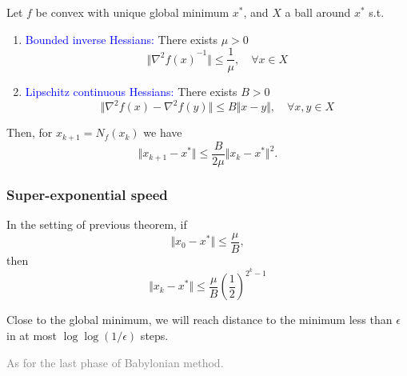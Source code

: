\documentclass[aspectratio=149]{beamer}
\begin{document}
\begin{frame}
  \begin{theorem}
    Let $f$ be convex with unique global minimum $x^*$, and $X$ a ball around $x^*$ s.t.
    \begin{enumerate}
      \item \textcolor{blue}{Bounded inverse Hessians:} There exists $\mu > 0$
            \begin{equation}
              \Vert {\nabla^2 f(x)}^{-1} \Vert \le \frac{1}{\mu}, \quad \forall x \in X
            \end{equation}
      \item \textcolor{blue}{Lipschitz continuous Hessians:} There exists $B>0$
            \begin{equation}
              \Vert \nabla^2 f(x) - \nabla^2 f(y) \Vert \le B \Vert x-y \Vert, \quad \forall x,y \in X
            \end{equation}
    \end{enumerate}
    Then, for $x_{k+1} = N_f(x_k)$ we have
    \begin{equation}
      \Vert x_{k+1} -x^* \Vert \le \frac{B}{2 \mu} \Vert x_k - x^* \Vert^2.
    \end{equation}
  \end{theorem}
\end{frame}


\begin{frame}
  \frametitle{Super-exponential speed}
  \begin{corollary}%
    In the setting of previous theorem, if
    \begin{equation}
      \Vert x_0 - x^* \Vert \le \frac{\mu}{B},
    \end{equation}
    then
    \begin{equation}
      \Vert x_k -x^*  \Vert \le \frac{\mu}{B} {\left( \frac{1}{2} \right)}^{2^k-1}
    \end{equation}
  \end{corollary}
  Close to the global minimum, we will reach distance to the minimum less than $\epsilon$ in at most $\log \log (1/\epsilon)$ steps.

  \textcolor{gray}{As for the last phase of Babylonian method.}
\end{frame}
\end{document}
